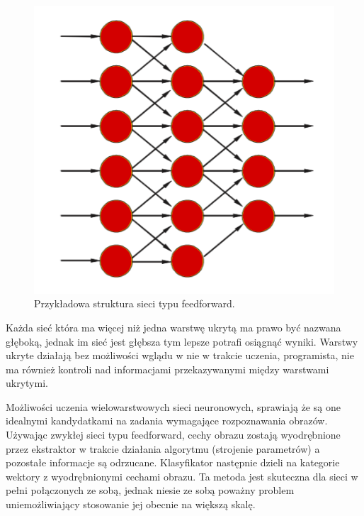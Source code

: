 \documentclass[12pt,a4paper,twoside,titlepage,openright]{book}
\begin{document}
\begin{figure}[ht]
	\centering
			\includegraphics[resolution=100, scale=0.6]{feedforwardNetwork.png}
		\caption{Przykładowa struktura sieci typu feedforward.}
\end{figure}

Każda sieć która ma więcej niż jedna warstwę ukrytą ma prawo być nazwana głęboką, jednak im sieć jest głębsza tym lepsze potrafi osiągnąć wyniki. Warstwy ukryte działają bez możliwości wglądu w nie w trakcie uczenia, programista, nie ma również kontroli nad informacjami przekazywanymi między warstwami ukrytymi.

Możliwości uczenia wielowarstwowych sieci neuronowych, sprawiają że są one idealnymi kandydatkami na zadania wymagające rozpoznawania obrazów. Używając zwykłej sieci typu feedforward, cechy obrazu zostają wyodrębnione przez ekstraktor w trakcie działania algorytmu (strojenie parametrów) a pozostałe informacje są odrzucane. Klasyfikator następnie dzieli na kategorie wektory z wyodrębnionymi cechami obrazu. Ta metoda jest skuteczna dla sieci w pełni połączonych ze sobą, jednak niesie ze sobą poważny problem uniemożliwiający stosowanie jej obecnie na większą skalę.
\end{document}
